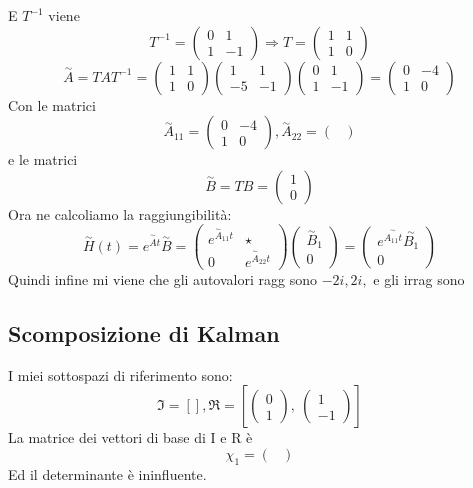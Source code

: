 \documentclass{article}
\begin{document}
E $T^{-1}$ viene \[ T^{-1} = \left(\begin{matrix}0 & 1\\1 & -1\end{matrix}\right) \Longrightarrow T = \left(\begin{matrix}1 & 1\\1 & 0\end{matrix}\right) \]
\[ \overset{\sim}{A} = T A  T^{-1} = \left(\begin{matrix}1 & 1\\1 & 0\end{matrix}\right)\left(\begin{matrix}1 & 1\\-5 & -1\end{matrix}\right)\left(\begin{matrix}0 & 1\\1 & -1\end{matrix}\right) = \left(\begin{matrix}0 & -4\\1 & 0\end{matrix}\right) \]Con le matrici \[ \overset{\sim}{A}_{11} = \left(\begin{matrix}0 & -4\\1 & 0\end{matrix}\right) , \overset{\sim}{A}_{22} = \left(\begin{matrix}\end{matrix}\right)  \]e le matrici \[ \overset{\sim}{B} = TB = \left(\begin{matrix}1\\0\end{matrix}\right)  \]
Ora ne calcoliamo la raggiungibilità: \[ \overset{\sim}{H}(t) = e^{\overset{\sim}{A}t}\overset{\sim}{B} = \begin{pmatrix} e^{\overset{\sim}{A}_{11}t} &  \star \\ 0 & e^{\overset{\sim}{A}_{22}t} \end{pmatrix} \begin{pmatrix} \overset{\sim}{B}_1 \\ 0 \end{pmatrix} = \begin{pmatrix} e^{\overset{\sim}{A_{11}t}}\overset{\sim}{B_1} \\ 0 \end{pmatrix} \]
Quindi infine mi viene che gli autovalori ragg sono $ - 2 i, 2 i,  $ e gli irrag sono $  $
\subsection{Scomposizione di Kalman}
I miei sottospazi di riferimento sono:	\[ \mathfrak{I} = \left[ \right], \mathfrak{R} = \left[ \left(\begin{matrix}0\\1\end{matrix}\right), \  \left(\begin{matrix}1\\-1\end{matrix}\right)\right] \]
La matrice dei vettori di base di I e R è \[ \chi_1 =  \left(\begin{matrix}\end{matrix}\right) \]Ed il determinante è ininfluente.
\end{document}
